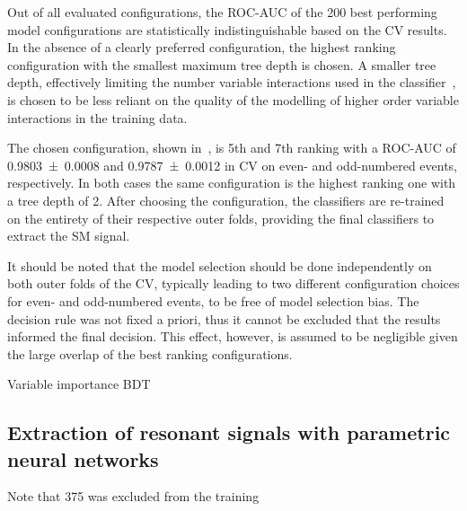 Out of all evaluated configurations, the ROC-AUC of the 200 best
performing model configurations are statistically indistinguishable
based on the CV results. In the absence of a clearly preferred
configuration, the highest ranking configuration with the smallest
maximum tree depth is chosen. A smaller tree depth, effectively
limiting the number variable interactions used in the
classifier~\cite{hastie09}, is chosen to be less reliant on the
quality of the modelling of higher order variable interactions in the
training data.

The chosen configuration, shown in~,
is 5th and 7th ranking with a ROC-AUC of \num{0.9803 +- 0.0008} and
\num{0.9787 +- 0.0012} in CV on even- and odd-numbered events,
respectively. In both cases the same configuration is the highest
ranking one with a tree depth of 2. After choosing the configuration,
the classifiers are re-trained on the entirety of their respective
outer folds, providing the final classifiers to extract the SM \HH
signal.

It should be noted that the model selection should be done
independently on both outer folds of the CV, typically leading to two
different configuration choices for even- and odd-numbered events, to
be free of model selection bias. The decision rule was not fixed a
priori, thus it cannot be excluded that the results informed the final
decision. This effect, however, is assumed to be negligible given the
large overlap of the best ranking configurations.



\begin{table}[htbp]
  \centering

  \caption{Variable importance BDT}
  \label{tab:variable_importance_bdt}
\end{table}





\subsection{Extraction of resonant signals with parametric neural networks}
\label{sec:mva_pnn}


Note that 375 was excluded from the training


